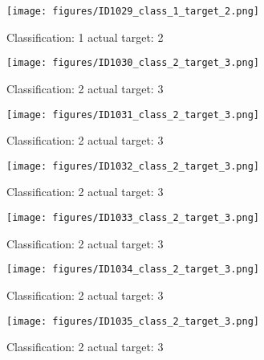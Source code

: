 \begin{figure}[h!]
\begin{center}
\texttt{[image: figures/ID1029\_class\_1\_target\_2.png]}
\end{center}
\caption{ Classification: 1 actual target: 2}
\label{fig:ID1029_class_1_target_2}
\end{figure}
\begin{figure}[h!]
\begin{center}
\texttt{[image: figures/ID1030\_class\_2\_target\_3.png]}
\end{center}
\caption{ Classification: 2 actual target: 3}
\label{fig:ID1030_class_2_target_3}
\end{figure}
\begin{figure}[h!]
\begin{center}
\texttt{[image: figures/ID1031\_class\_2\_target\_3.png]}
\end{center}
\caption{ Classification: 2 actual target: 3}
\label{fig:ID1031_class_2_target_3}
\end{figure}
\begin{figure}[h!]
\begin{center}
\texttt{[image: figures/ID1032\_class\_2\_target\_3.png]}
\end{center}
\caption{ Classification: 2 actual target: 3}
\label{fig:ID1032_class_2_target_3}
\end{figure}
\begin{figure}[h!]
\begin{center}
\texttt{[image: figures/ID1033\_class\_2\_target\_3.png]}
\end{center}
\caption{ Classification: 2 actual target: 3}
\label{fig:ID1033_class_2_target_3}
\end{figure}
\begin{figure}[h!]
\begin{center}
\texttt{[image: figures/ID1034\_class\_2\_target\_3.png]}
\end{center}
\caption{ Classification: 2 actual target: 3}
\label{fig:ID1034_class_2_target_3}
\end{figure}
\begin{figure}[h!]
\begin{center}
\texttt{[image: figures/ID1035\_class\_2\_target\_3.png]}
\end{center}
\caption{ Classification: 2 actual target: 3}
\label{fig:ID1035_class_2_target_3}
\end{figure}
